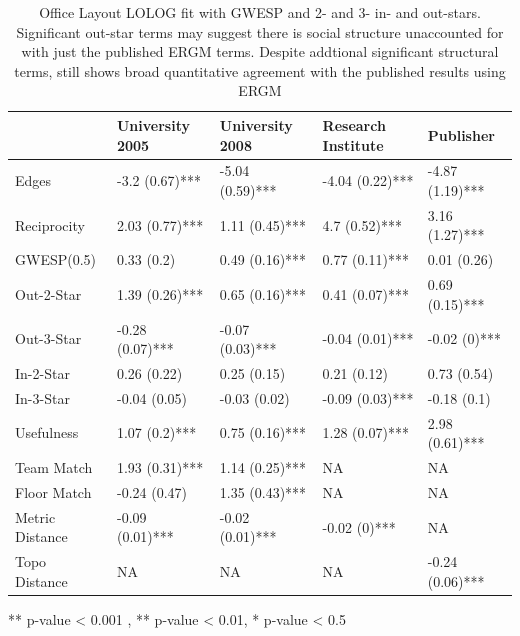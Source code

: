 \documentclass[
]{statsoc}
\begin{document}
\begin{table}

\caption{\label{tab:unnamed-chunk-4}\label{tab:sailer_lolog_gwesp_star}
      Office Layout LOLOG fit with GWESP and 2- and 3- in- and out-stars. Significant out-star terms may suggest there is social structure unaccounted for with just the published ERGM terms. Despite addtional significant structural terms, still shows broad quantitative agreement with the published results using ERGM}
\centering
\begin{threeparttable}
\begin{tabular}[t]{lllll}
\toprule
  & University 2005 & University 2008 & Research Institute & Publisher\\
\midrule
\rowcolor{gray!6}  Edges & -3.2 (0.67)*** & -5.04 (0.59)*** & -4.04 (0.22)*** & -4.87 (1.19)***\\
Reciprocity & 2.03 (0.77)*** & 1.11 (0.45)*** & 4.7 (0.52)*** & 3.16 (1.27)***\\
\rowcolor{gray!6}  GWESP(0.5) & 0.33 (0.2) & 0.49 (0.16)*** & 0.77 (0.11)*** & 0.01 (0.26)\\
Out-2-Star & 1.39 (0.26)*** & 0.65 (0.16)*** & 0.41 (0.07)*** & 0.69 (0.15)***\\
\rowcolor{gray!6}  Out-3-Star & -0.28 (0.07)*** & -0.07 (0.03)*** & -0.04 (0.01)*** & -0.02 (0)***\\
\addlinespace
In-2-Star & 0.26 (0.22) & 0.25 (0.15) & 0.21 (0.12) & 0.73 (0.54)\\
\rowcolor{gray!6}  In-3-Star & -0.04 (0.05) & -0.03 (0.02) & -0.09 (0.03)*** & -0.18 (0.1)\\
Usefulness & 1.07 (0.2)*** & 0.75 (0.16)*** & 1.28 (0.07)*** & 2.98 (0.61)***\\
\rowcolor{gray!6}  Team Match & 1.93 (0.31)*** & 1.14 (0.25)*** & NA & NA\\
Floor Match & -0.24 (0.47) & 1.35 (0.43)*** & NA & NA\\
\addlinespace
\rowcolor{gray!6}  Metric Distance & -0.09 (0.01)*** & -0.02 (0.01)*** & -0.02 (0)*** & NA\\
Topo Distance & NA & NA & NA & -0.24 (0.06)***\\
\bottomrule
\end{tabular}
\begin{tablenotes}
\item *** p-value < 0.001 , ** p-value < 0.01, * p-value < 0.5
\end{tablenotes}
\end{threeparttable}
\end{table}
\end{document}
